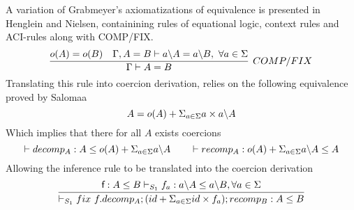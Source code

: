 \documentclass[a4paper,UKenglish,cleveref, autoref, thm-restate]{lipics-v2021}
\begin{document}
\begin{example}[Grabmeyer]
A variation of Grabmeyer's axiomatizations of equivalence is presented in Henglein and Nielsen, containining rules of equational logic, context rules and ACI-rules along with COMP/FIX.
\[\infer[\mathsf{COMP/FIX}]{\Gamma \vdash A =  B}{\myo{A} =  \myo{B} & \Gamma, A = B \vdash \derive{a}{A} = \derive{a}{B},~\forall a \in \Sigma}\] 
Translating this rule into coercion derivation, relies on the following equivalence proved by Salomaa
\[ A = o(A) + \Sigma_{a \in \Sigma} a\times a \backslash A\]
Which implies that there for all $A$ exists coercions
\[\contains{}{decomp_A}{A}{\myo{A} + \Sigma_{a \in \Sigma} \derive{a}{A}} \qquad \contains{}{recomp_A}{\myo{A} + \Sigma_{a \in \Sigma} \derive{a}{A}}{A}\]
Allowing the inference rule to be translated into the coercion derivation
\[\infer{\containsP{}{\fix ~f.decomp_A;(id + \Sigma_{a \in \Sigma} id\times f_a); recomp_B}{A}{B}{S_1}}{\containsP{\dslcom{f} : A \leq B}{f_a}{\derive{a}{A}}{\derive{a}{B}}{S_1}, \forall a \in \Sigma} \]

\end{example}
\end{document}
